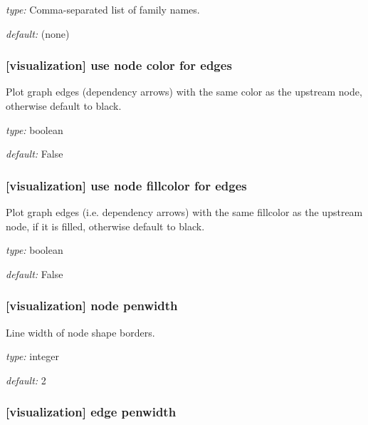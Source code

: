 \begin{myitemize}
    \item {\em type:} Comma-separated list of family names.
    \item {\em default:} (none)
\end{myitemize}

\subsubsection[use node color for edges]{[visualization] \textrightarrow use node color for edges}

Plot graph edges (dependency arrows) with the same color as the upstream
node, otherwise default to black.

\begin{myitemize}
    \item {\em type:} boolean
    \item {\em default:} False
\end{myitemize}

\subsubsection[use node fillcolor for edges]{[visualization] \textrightarrow use node fillcolor for edges}

Plot graph edges (i.e. dependency arrows) with the same fillcolor as the
upstream node, if it is filled, otherwise default to black.

\begin{myitemize}
    \item {\em type:} boolean
    \item {\em default:} False
\end{myitemize}

\subsubsection[node penwidth]{[visualization] \textrightarrow node penwidth}

Line width of node shape borders.

\begin{myitemize}
    \item {\em type:} integer
    \item {\em default:} 2
\end{myitemize}

\subsubsection[edge penwidth]{[visualization] \textrightarrow edge penwidth}

